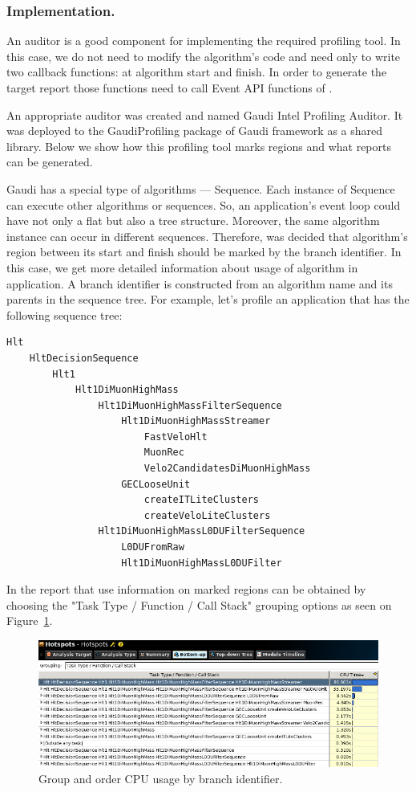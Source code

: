 \documentclass[a4paper]{jpconf}
\begin{document}
\subsubsection{Implementation.}

An auditor is a good component for implementing the required profiling tool. In this case, we do not need to modify 
the algorithm’s code and need only to write two callback functions: at algorithm start and finish. In order to generate 
the target report those functions need to call Event API functions of \amp.

An appropriate auditor was created and named Gaudi Intel Profiling Auditor. It was deployed to the GaudiProfiling 
package of Gaudi framework as a shared library. Below we show how this profiling tool marks regions and what reports 
can be generated.

Gaudi has a special type of algorithms --- Sequence. Each instance of Sequence can execute other algorithms or 
sequences. So, an application’s event loop could have not only a flat but also a tree structure. Moreover, the same 
algorithm instance can occur in different sequences. Therefore, was decided that algorithm’s region between its start 
and finish should be marked by the branch identifier. In this case, we get more detailed information about usage of 
algorithm in application. A branch identifier is constructed from an algorithm name and its parents 
in the sequence tree. For example, let’s profile an application that has the following sequence tree:
\begin{verbatim}
Hlt 
    HltDecisionSequence 
        Hlt1 
            Hlt1DiMuonHighMass
                Hlt1DiMuonHighMassFilterSequence
                    Hlt1DiMuonHighMassStreamer
                        FastVeloHlt
                        MuonRec
                        Velo2CandidatesDiMuonHighMass
                    GECLooseUnit
                        createITLiteClusters
                        createVeloLiteClusters
                Hlt1DiMuonHighMassL0DUFilterSequence
                    L0DUFromRaw
                    Hlt1DiMuonHighMassL0DUFilter
\end{verbatim}

In \amp the report that use information on marked regions can be obtained by choosing the 
"Task Type / Function / Call Stack" grouping options as seen on Figure~\ref{fig08}.

\begin{figure}[H]
\begin{minipage}{\textwidth}
\includegraphics[width=\textwidth]{figs/fig08.png}
\caption{\label{fig08}Group and order CPU usage by branch identifier.}
\end{minipage}
\end{figure}
\end{document}
